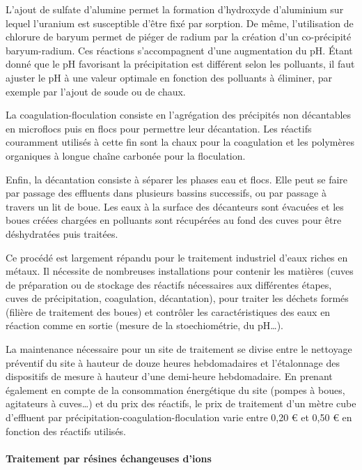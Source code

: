 \documentclass{article}
\begin{document}
L’ajout de sulfate d’alumine permet la formation d’hydroxyde d’aluminium sur lequel l'uranium est susceptible d'être fixé par sorption. De même, l’utilisation de chlorure de baryum permet de piéger de radium par la création d’un co-précipité baryum-radium. Ces réactions s’accompagnent d’une augmentation du pH. Étant donné que le pH favorisant la précipitation est différent selon les polluants, il faut ajuster le pH à une valeur optimale en fonction des polluants à éliminer, par exemple par l’ajout de soude ou de chaux.  

La coagulation-floculation consiste en l’agrégation des précipités non décantables en microflocs puis en flocs  pour permettre leur décantation. Les réactifs couramment utilisés à cette fin sont la chaux pour la coagulation et les polymères organiques à longue chaîne carbonée pour la floculation. 

Enfin, la décantation consiste à séparer les phases eau et flocs. Elle peut se faire par passage des effluents dans plusieurs bassins successifs, ou par passage à travers un lit de boue. Les eaux à la surface des décanteurs sont évacuées et les boues créées chargées en polluants sont récupérées au fond des cuves pour être déshydratées puis traitées.

Ce procédé est largement répandu pour le traitement industriel d’eaux riches en métaux. Il nécessite de nombreuses installations pour contenir les matières (cuves de préparation ou de stockage des réactifs nécessaires aux différentes étapes, cuves de précipitation, coagulation, décantation), pour traiter les déchets formés (filière de traitement des boues) et contrôler les caractéristiques des eaux en réaction comme en sortie (mesure de la stoechiométrie, du pH…). 

La maintenance nécessaire pour un site de traitement se divise entre le nettoyage préventif du site à hauteur de douze heures hebdomadaires et l’étalonnage des dispositifs de mesure à hauteur d’une demi-heure hebdomadaire. En prenant également en compte de la consommation énergétique du site (pompes à boues, agitateurs à cuves…) et du prix des réactifs, le prix de traitement d’un mètre cube d’effluent par précipitation-coagulation-floculation varie entre 0,20 € et 0,50 € en fonction des réactifs utilisés.

\paragraph{Traitement par résines échangeuses d’ions} \hspace{1 em}
\end{document}
